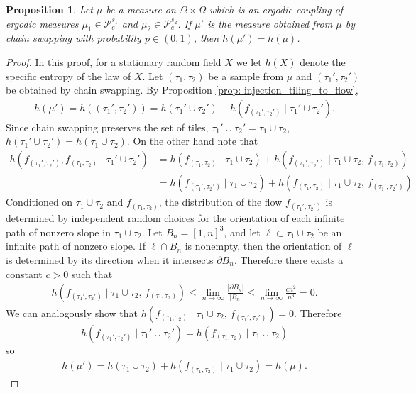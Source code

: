 \documentclass[11pt]{article}
\newtheorem{prop}[thm]{Proposition}
\theoremstyle{remark}
\theoremstyle{definition}
\newcommand{\Prob}{\mathcal P}
\begin{document}
\begin{prop}\label{prop: coupling swap entropy}
	Let $\mu$ be a measure on $\Omega\times \Omega$ which is an ergodic coupling of ergodic measures $\mu_1\in \Prob_e^{s_1}$ and $\mu_2\in \Prob_e^{s_2}$. If $\mu'$ is the measure obtained from $\mu$ by chain swapping with probability $p\in (0,1)$, then $h(\mu')= h(\mu)$.
	\end{prop}
\begin{proof}
In this proof, for a stationary random field $X$ we let $h(X)$ denote the specific entropy of the law of $X$. Let $(\tau_1,\tau_2)$ be a sample from $\mu$ and $(\tau_1',\tau_2')$ be obtained by chain swapping. By Proposition \ref{prop: injection_tiling_to_flow},
    \begin{align*}
        h(\mu') = h((\tau_1',\tau_2')) = h(\tau_1'\cup \tau_2') + h(f_{(\tau_1',\tau_2')}\mid \tau_1'\cup \tau_2').
    \end{align*}
  Since chain swapping preserves the set of tiles, $\tau_1'\cup \tau_2' = \tau_1 \cup \tau_2$, $h(\tau_1'\cup \tau_2') = h(\tau_1\cup\tau_2)$. On the other hand note that
\begin{align*}
h(f_{(\tau_1',\tau_2')}, f_{(\tau_1, \tau_2)}\mid \tau_1'\cup \tau_2') &= h(f_{(\tau_1,\tau_2)} \mid \tau_1\cup \tau_2) + h(f_{(\tau_1',\tau_2')} \mid \tau_1\cup \tau_2,
\,f_{(\tau_1,\tau_2)})\\&=
h(f_{(\tau_1',\tau_2')} \mid \tau_1\cup \tau_2) + h(f_{(\tau_1,\tau_2)} \mid \tau_1\cup \tau_2,
\,f_{(\tau_1',\tau_2')})
\end{align*}    
Conditioned on $\tau_1\cup \tau_2$ and $f_{(\tau_1,\tau_2)}$, the distribution of the flow $f_{(\tau_1',\tau_2')}$ is determined by independent random choices for the orientation of each infinite path of nonzero slope in $\tau_1\cup \tau_2$. Let $B_n = [1,n]^3$, and let $\ell\subset \tau_1\cup \tau_2$ be an infinite path of nonzero slope. If $\ell \cap B_n$ is nonempty, then the orientation of $\ell$ is determined by its direction when it intersects $\partial B_n$. Therefore there exists a constant $c>0$ such that 
    \begin{align*}
        h(f_{(\tau_1',\tau_2')} \mid \tau_1\cup \tau_2,
    \,f_{(\tau_1,\tau_2)}) \leq \lim_{n\to \infty}\frac{|\partial B_n|}{|B_n|}\leq \lim_{n\to \infty} \frac{c n^2}{n^3} = 0.
    \end{align*}
 We can analogously show that $ h(f_{(\tau_1,\tau_2)} \mid \tau_1\cup \tau_2,
\,f_{(\tau_1',\tau_2')}) = 0$. Therefore 
$$h(f_{(\tau_1',\tau_2')}\mid \tau_1'\cup \tau_2')= h(f_{(\tau_1,\tau_2)}\mid \tau_1\cup \tau_2)$$
so
    \begin{align*}
        h(\mu') = h(\tau_1\cup \tau_2) + h(f_{(\tau_1,\tau_2)} \mid \tau_1\cup \tau_2) = h(\mu).
    \end{align*}
 \end{proof}
 
\end{document}
